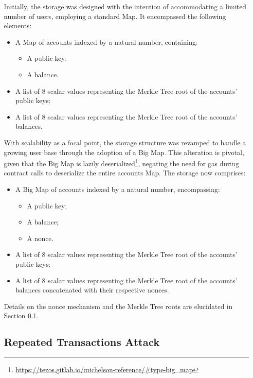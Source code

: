 Initially, the storage was designed with the intention of accommodating a limited number of users, employing a standard Map. It encompassed the following elements:
\begin{itemize}
	\item A Map of accounts indexed by a natural number, containing:
		\begin{itemize}
			\item A public key;
			\item A balance.
		\end{itemize}
	\item A list of 8 scalar values representing the Merkle Tree root of the accounts' public keys;
	\item A list of 8 scalar values representing the Merkle Tree root of the accounts' balances.
\end{itemize}

With scalability as a focal point, the storage structure was revamped to handle a growing user base through the adoption of a Big Map. This alteration is pivotal, given that the Big Map is lazily deserialized\footnote{\url{https://tezos.gitlab.io/michelson-reference/\#type-big_map}}, negating the need for gas during contract calls to deserialize the entire accounts Map. The storage now comprises:
\begin{itemize}
	\item A Big Map of accounts indexed by a natural number, encompassing:
		\begin{itemize}
			\item A public key;
			\item A balance;
			\item A nonce.
		\end{itemize}
	\item A list of 8 scalar values representing the Merkle Tree root of the accounts' public keys;
	\item A list of 8 scalar values representing the Merkle Tree root of the accounts' balances concatenated with their respective nonces.
\end{itemize}

Details on the nonce mechanism and the Merkle Tree roots are elucidated in Section \ref{subsec:repeatedtransactionsattack}.

\subsection{Repeated Transactions Attack}
\label{subsec:repeatedtransactionsattack}

